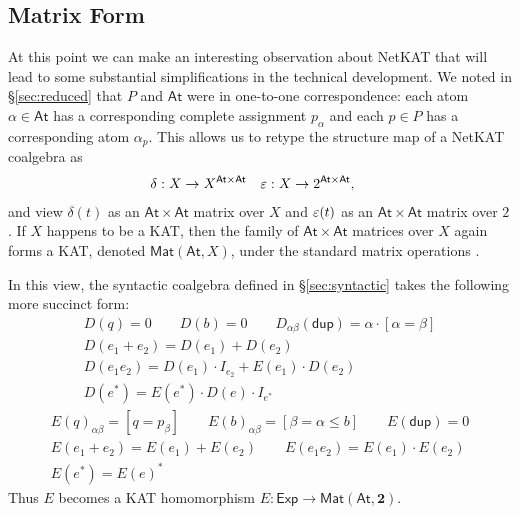 \documentclass{article}
\newcommand\At{\ensuremath{\mathsf{At}}}
\newcommand\Two{\mathbf{2}}
\newcommand\Exp{\mathsf{Exp}}
\newcommand\bval[1]{[#1]}
\renewcommand\star{^*}
\newcommand\Mat[2]{\mathsf{Mat}(#1,#2)}
\newcommand{\netkat}{NetKAT\xspace}
\newcommand{\kw}[1]{\ensuremath{\mathsf{#1}}}
\newcommand{\pdup}{\ensuremath{\mathrel{\kw{dup}}}}
\begin{document}
\subsection{Matrix Form}
\label{sec:matrix}

At this point we can make an interesting observation about \netkat that will lead to some substantial simplifications in the technical development. We noted in \S\ref{sec:reduced} that $P$ and $\At$ were in one-to-one correspondence: each atom $\alpha\in\At$ has a corresponding complete assignment $p_\alpha$ and each $p\in P$ has a corresponding atom $\alpha_p$. This allows us to retype the structure map of a \netkat coalgebra as
\begin{align*}
\delta &: X\to X^{\At\times\At} & \eps &: X\to 2^{\At\times\At},
\end{align*}
and view $\delta(t)$ as an $\At\times\At$ matrix over $X$ and $\varepsilon(t)$ as an $\At\times\At$ matrix over $2$. If $X$ happens to be a KAT, then the family of $\At\times\At$ matrices over $X$ again forms a KAT, denoted $\Mat\At X$, under the standard matrix operations \cite{CKS96a}.

In this view, the syntactic coalgebra defined in \S\ref{sec:syntactic} takes the following more succinct form:
\begin{gather*}
D(q) = 0 \qquad
D(b) = 0 \qquad
D_{\alpha\beta}(\pdup) = \alpha\cdot\bval{\alpha=\beta}\\
D(e_1+e_2) = D(e_1)+D(e_2)\\
D(e_1e_2) = D(e_1)\cdot I_{e_2} + E(e_1)\cdot D(e_2)\\
D(e\star) = E(e\star)\cdot D(e)\cdot I_{e^*}
\end{gather*}
\begin{gather*}
E(q)_{\alpha\beta} = \bval{q = p_\beta} \qquad
E(b)_{\alpha\beta} = \bval{\beta=\alpha\leq b} \qquad
E(\pdup) = 0\\
E(e_1+e_2) = E(e_1)+E(e_2) \qquad
E(e_1e_2) = E(e_1)\cdot E(e_2)\\
E(e\star) = E(e)\star
\end{gather*}
Thus $E$ becomes a KAT homomorphism $E:\Exp\to\Mat\At\Two$.
\end{document}
